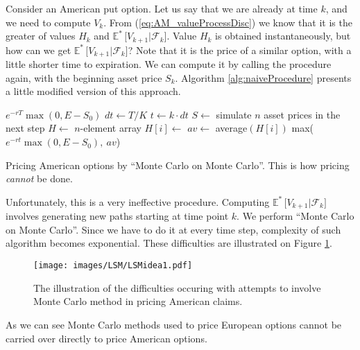 \documentclass[a4paper,12pt, oneside]{book}
\theoremstyle{definition}
\theoremstyle{remark}
\def\Em{{\mathbb{E}^*}\,}
\begin{document}
Consider an American put option. Let us say that we are already at time $k$, and we need to compute $V_{k}$. From (\ref{eq:AM_valueProcessDisc}) we know that it is the greater of values $H_{k}$ and $\Em\bigl[ V_{k+1} | \mathcal{F}_{k} \bigr]$. Value $H_{k}$ is obtained instantaneously, but how can we get $\Em\bigl[ V_{k+1} | \mathcal{F}_{k} \bigr]$? Note that it is the price of a similar option, with a little shorter time to expiration. We can compute it by calling the procedure again, with the beginning asset price $S_{k}$. Algorithm \ref{alg:naiveProcedure} presents a little modified version of this approach.

\begin{algorithm}
 \begin{algorithmic}[1]
      \State \Return $e^{-rT} \max(0, E - S_0)$
    \EndIf
    \State $dt \gets T/K$
    \State $t \gets k\cdot dt$
    \State $S \gets$ simulate $n$ asset prices in the next step 
    \State $H \gets$ $n$-element array
       \State $H[i] \gets$ 
    \EndFor 
    \State $av \gets$ average$(H[i])$
    \State \Return max($e^{-rt} \max(0, E - S_0),\ av$)
  \EndFunction 
 \end{algorithmic}
 \caption{Pricing American options by ``Monte Carlo on Monte Carlo''. This is how pricing \emph{cannot} be done.}
 \label{alg:naiveProcedure}
\end{algorithm}

Unfortunately, this is a very ineffective procedure. Computing $\Em\bigl[ V_{k+1} | \mathcal{F}_{k} \bigr]$ involves generating new paths starting at time point $k$. We perform ``Monte Carlo on Monte Carlo''. Since we have to do it at every time step, complexity of such algorithm becomes exponential. These difficulties are illustrated on Figure \ref{fig:MC_difficulties}.

\begin{figure}[!ht]
\centering
 \texttt{[image: images/LSM/LSMidea1.pdf]}
\caption{The illustration of the difficulties occuring with attempts to involve Monte Carlo method in pricing American claims. }
\label{fig:MC_difficulties}
\end{figure}

As we can see Monte Carlo methods used to price European options cannot be carried over directly to price American options.
\end{document}
